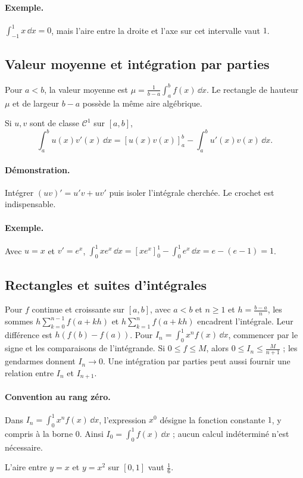 \paragraph{Exemple.} $\int_{-1}^{1}x\,\dd x=0$, mais l'aire entre la droite et l'axe sur cet intervalle vaut $1$.
\subsection{Valeur moyenne et intégration par parties}
Pour $a<b$, la valeur moyenne est $\mu=\frac1{b-a}\int_a^b f(x)\,\dd x$. Le rectangle de hauteur $\mu$ et de largeur $b-a$ possède la même aire algébrique.
\begin{keypoint}
Si $u,v$ sont de classe $\mathcal C^1$ sur $[a,b]$,
\[\int_a^b u(x)v'(x)\,\dd x=[u(x)v(x)]_a^b-\int_a^b u'(x)v(x)\,\dd x.\]
\end{keypoint}
\paragraph{Démonstration.} Intégrer $(uv)'=u'v+uv'$ puis isoler l'intégrale cherchée. Le crochet est indispensable.
\paragraph{Exemple.} Avec $u=x$ et $v'=e^x$, $\int_0^1xe^x\,\dd x=[xe^x]_0^1-\int_0^1e^x\,\dd x=e-(e-1)=1$.
\subsection{Rectangles et suites d'intégrales}
Pour $f$ continue et croissante sur $[a,b]$, avec $a<b$ et $n\ge1$ et $h=\frac{b-a}{n}$, les sommes $h\sum_{k=0}^{n-1}f(a+kh)$ et $h\sum_{k=1}^{n}f(a+kh)$ encadrent l'intégrale. Leur différence est $h(f(b)-f(a))$.
Pour $I_n=\int_0^1x^nf(x)\,\dd x$, commencer par le signe et les comparaisons de l'intégrande. Si $0\le f\le M$, alors $0\le I_n\le \frac{M}{n+1}$ ; les gendarmes donnent $I_n\to0$. Une intégration par parties peut aussi fournir une relation entre $I_n$ et $I_{n+1}$.
\paragraph{Convention au rang zéro.} Dans $I_n=\int_0^1x^nf(x)\,\dd x$, l'expression $x^0$ désigne la fonction constante $1$, y compris à la borne $0$. Ainsi $I_0=\int_0^1f(x)\,\dd x$ ; aucun calcul indéterminé n'est nécessaire.


\begin{center}\par\small L'aire entre $y=x$ et $y=x^2$ sur $[0,1]$ vaut $\frac{1}{6}$.\end{center}

